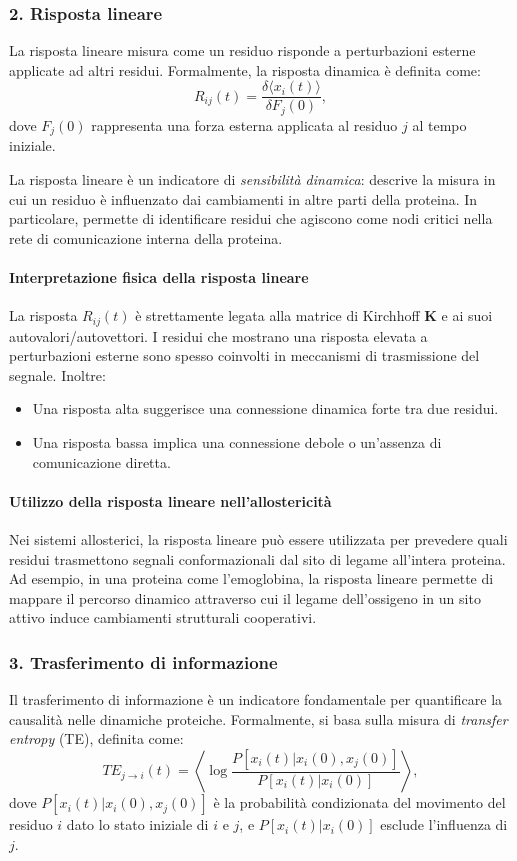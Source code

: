 \documentclass[Lau,binding=0.6cm,oneside,noexaminfo]{sapthesis}
\begin{document}
\subsubsection*{2. Risposta lineare}
La risposta lineare misura come un residuo risponde a perturbazioni esterne applicate ad altri residui. Formalmente, la risposta dinamica è definita come:
\begin{equation}
R_{ij}(t) = \frac{\delta \langle x_i(t) \rangle}{\delta F_j(0)},
\end{equation}
dove $F_j(0)$ rappresenta una forza esterna applicata al residuo $j$ al tempo iniziale.

La risposta lineare è un indicatore di \textit{sensibilità dinamica}: descrive la misura in cui un residuo è influenzato dai cambiamenti in altre parti della proteina. In particolare, permette di identificare residui che agiscono come nodi critici nella rete di comunicazione interna della proteina.

\paragraph{Interpretazione fisica della risposta lineare}
La risposta $R_{ij}(t)$ è strettamente legata alla matrice di Kirchhoff $\mathbf{K}$ e ai suoi autovalori/autovettori. I residui che mostrano una risposta elevata a perturbazioni esterne sono spesso coinvolti in meccanismi di trasmissione del segnale. Inoltre:
\begin{itemize}
    \item Una risposta alta suggerisce una connessione dinamica forte tra due residui.
    \item Una risposta bassa implica una connessione debole o un’assenza di comunicazione diretta.
\end{itemize}

\paragraph{Utilizzo della risposta lineare nell'allostericità}
Nei sistemi allosterici, la risposta lineare può essere utilizzata per prevedere quali residui trasmettono segnali conformazionali dal sito di legame all'intera proteina. Ad esempio, in una proteina come l’emoglobina, la risposta lineare permette di mappare il percorso dinamico attraverso cui il legame dell’ossigeno in un sito attivo induce cambiamenti strutturali cooperativi.

\subsubsection*{3. Trasferimento di informazione}
Il trasferimento di informazione è un indicatore fondamentale per quantificare la causalità nelle dinamiche proteiche. Formalmente, si basa sulla misura di \textit{transfer entropy} (TE), definita come:
\begin{equation}
TE_{j \to i}(t) = \left\langle \log \frac{P[x_i(t) | x_i(0), x_j(0)]}{P[x_i(t) | x_i(0)]} \right\rangle,
\end{equation}
dove $P[x_i(t) | x_i(0), x_j(0)]$ è la probabilità condizionata del movimento del residuo $i$ dato lo stato iniziale di $i$ e $j$, e $P[x_i(t) | x_i(0)]$ esclude l’influenza di $j$.
\end{document}
